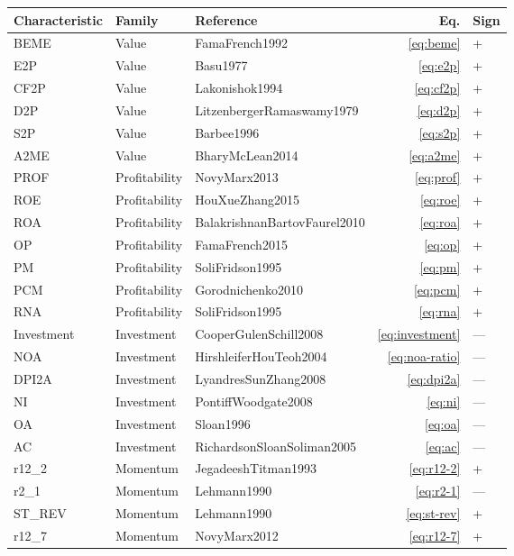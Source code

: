 \begin{table}[!ht]
\centering
\footnotesize
\begin{tabular}{lllrl}
\toprule
\textbf{Characteristic} & \textbf{Family} & \textbf{Reference} & \textbf{Eq.} & \textbf{Sign} \\
\midrule
BEME & Value & FamaFrench1992 & \ref{eq:beme} & + \\
E2P & Value & Basu1977 & \ref{eq:e2p} & + \\
CF2P & Value & Lakonishok1994 & \ref{eq:cf2p} & + \\
D2P & Value & LitzenbergerRamaswamy1979 & \ref{eq:d2p} & + \\
S2P & Value & Barbee1996 & \ref{eq:s2p} & + \\
A2ME & Value & BharyMcLean2014 & \ref{eq:a2me} & + \\
\midrule
PROF & Profitability & NovyMarx2013 & \ref{eq:prof} & + \\
ROE & Profitability & HouXueZhang2015 & \ref{eq:roe} & + \\
ROA & Profitability & BalakrishnanBartovFaurel2010 & \ref{eq:roa} & + \\
OP & Profitability & FamaFrench2015 & \ref{eq:op} & + \\
PM & Profitability & SoliFridson1995 & \ref{eq:pm} & + \\
PCM & Profitability & Gorodnichenko2010 & \ref{eq:pcm} & + \\
RNA & Profitability & SoliFridson1995 & \ref{eq:rna} & + \\
\midrule
Investment & Investment & CooperGulenSchill2008 & \ref{eq:investment} & --- \\
NOA & Investment & HirshleiferHouTeoh2004 & \ref{eq:noa-ratio} & --- \\
DPI2A & Investment & LyandresSunZhang2008 & \ref{eq:dpi2a} & --- \\
NI & Investment & PontiffWoodgate2008 & \ref{eq:ni} & --- \\
OA & Investment & Sloan1996 & \ref{eq:oa} & --- \\
AC & Investment & RichardsonSloanSoliman2005 & \ref{eq:ac} & --- \\
\midrule
r12\_2 & Momentum & JegadeeshTitman1993 & \ref{eq:r12-2} & + \\
r2\_1 & Momentum & Lehmann1990 & \ref{eq:r2-1} & --- \\
ST\_REV & Momentum & Lehmann1990 & \ref{eq:st-rev} & + \\
r12\_7 & Momentum & NovyMarx2012 & \ref{eq:r12-7} & + \\

\end{tabular}
\end{table}
